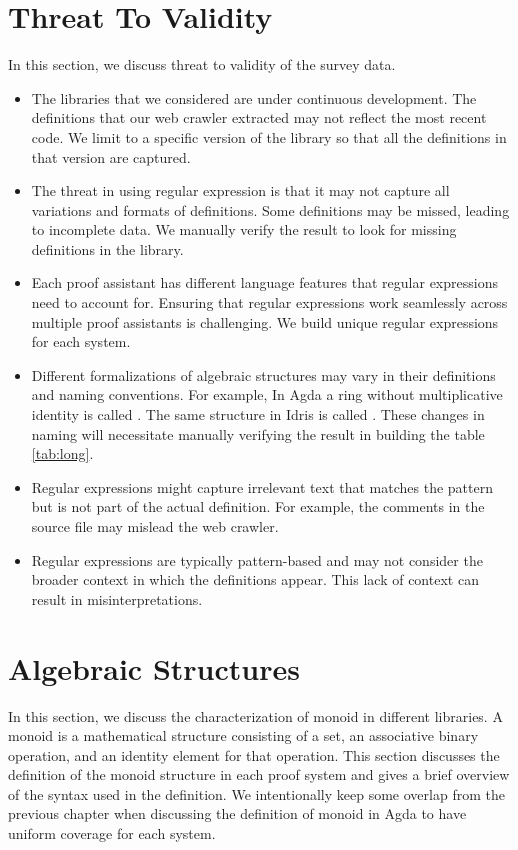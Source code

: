 \section{Threat To Validity}
\label{threat}
In this section, we discuss threat to validity of the survey data. 
\begin{itemize}

  \item The libraries that we considered are under continuous
  development. The definitions that our web crawler extracted may not reflect
  the most recent code. We limit to a specific version of the library so that
  all the definitions in that version are captured. 
  \item  The threat in using regular expression is that it may not capture all
  variations and formats of definitions. Some definitions may be missed, leading
  to incomplete data. We manually verify the result to look for missing
  definitions in the library.
  \item Each proof assistant has different language features that regular
  expressions need to account for. Ensuring that regular expressions work
  seamlessly across multiple proof assistants is challenging. We build unique
  regular expressions for each system.
  \item Different formalizations of algebraic structures may vary in their
  definitions and naming conventions. For example, In Agda a ring without
  multiplicative identity is called . The same structure
  in Idris is called . These changes in naming will necessitate 
  manually verifying the result in building the table \ref{tab:long}.
  \item Regular expressions might capture irrelevant text that matches the
  pattern but is not part of the actual definition. For example, the comments in
  the source file may mislead the web crawler.
  \item Regular expressions are typically pattern-based and may not consider the
  broader context in which the definitions appear. This lack of context can
  result in misinterpretations.
\end{itemize} 

\section{Algebraic Structures}
\label{algebraic_structure}
In this section, we discuss the characterization of monoid in different
libraries. A monoid is a mathematical structure consisting of a set, an
associative binary operation, and an identity element for that operation. This
section discusses the definition of the monoid structure in each proof system
and gives a brief overview of the syntax used in the definition. We
intentionally keep some overlap from the previous chapter when discussing the
definition of monoid in Agda to have uniform coverage for each system.

